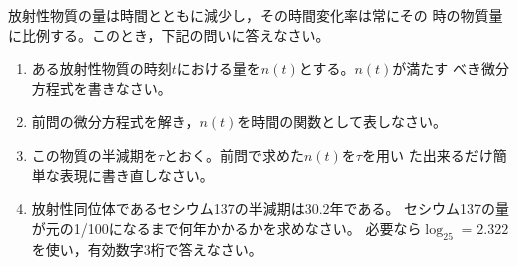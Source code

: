 \documentclass[twocolumn,11pt]{jarticle}
\begin{document}
\nquestion 放射性物質の量は時間とともに減少し，その時間変化率は常にその
時の物質量に比例する。このとき，下記の問いに答えなさい。
\begin{enumerate}
\item ある放射性物質の時刻$t$における量を$n(t)$とする。$n(t)$が満たす
  べき微分方程式を書きなさい。
\item 前問の微分方程式を解き，$n(t)$を時間の関数として表しなさい。
\item この物質の半減期を$\tau$とおく。前問で求めた$n(t)$を$\tau$を用い
  た出来るだけ簡単な表現に書き直しなさい。
\item 放射性同位体であるセシウム137の半減期は$30.2$年である。
  セシウム137の量が元の1/100になるまで何年かかるかを求めなさい。
  必要なら$\log_25=2.322$を使い，有効数字3桁で答えなさい。
\end{enumerate}
\end{document}
